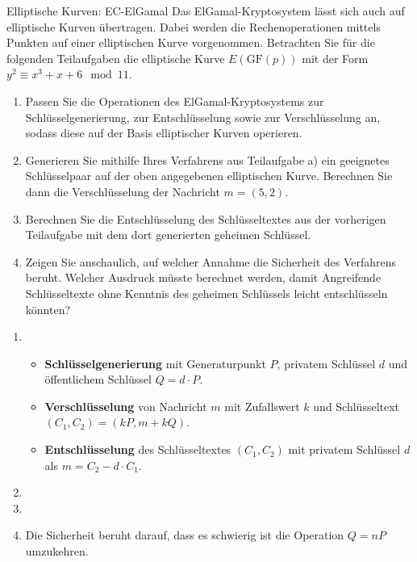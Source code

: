 \documentclass{article}
\begin{document}
\setcounter{subsection}{1615}
\begin{exercise}{Elliptische Kurven: EC-ElGamal}\label{ex:elliptic}
  Das ElGamal-Kryptosystem lässt sich auch auf elliptische Kurven übertragen. Dabei werden die Rechenoperationen mittels Punkten auf einer elliptischen Kurve vorgenommen. Betrachten Sie für die folgenden Teilaufgaben die elliptische Kurve $E(\text{GF}(p))$ mit der Form $y^2 \equiv x^3 + x + 6 \mod 11$.
  \begin{enumerate}
    \item Passen Sie die Operationen des ElGamal-Kryptosystems zur Schlüsselgenerierung, zur Entschlüsselung sowie zur Verschlüsselung an, sodass diese auf der Basis elliptischer Kurven operieren.
    \item Generieren Sie mithilfe Ihres Verfahrens aus Teilaufgabe a) ein geeignetes Schlüsselpaar auf der oben angegebenen elliptischen Kurve. Berechnen Sie dann die Verschlüsselung der Nachricht $m = (5, 2)$.
    \item Berechnen Sie die Entschlüsselung des Schlüsseltextes aus der vorherigen Teilaufgabe mit dem dort generierten geheimen Schlüssel.
    \item Zeigen Sie anschaulich, auf welcher Annahme die Sicherheit des Verfahrens beruht. Welcher Ausdruck müsste berechnet werden, damit Angreifende Schlüsseltexte ohne Kenntnis des geheimen Schlüssels leicht entschlüsseln könnten?
  \end{enumerate}

  \begin{solution}
    \begin{enumerate}
        \item 
          \begin{itemize}
            \item \textbf{Schlüsselgenerierung} mit Generaturpunkt $P$, privatem Schlüssel $d$ und öffentlichem Schlüssel $Q = d \cdot P$.
            \item \textbf{Verschlüsselung} von Nachricht $m$ mit Zufallswert $k$ und Schlüsseltext $(C_1, C_2) = (kP, m + kQ)$.
            \item \textbf{Entschlüsselung} des Schlüsseltextes $(C_1, C_2)$ mit privatem Schlüssel $d$ als $m = C_2 - d \cdot C_1$.
          \end{itemize}
        \item %
        \item %
        \item Die Sicherheit beruht darauf, dass es schwierig ist die Operation $Q=nP$ umzukehren.
    \end{enumerate}
  \end{solution}
\end{exercise}
\end{document}
